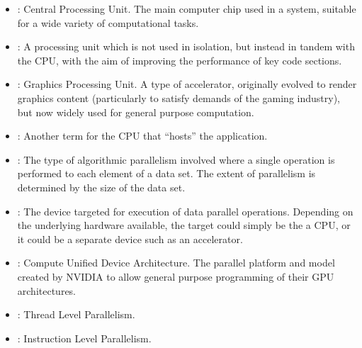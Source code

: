 \begin{itemize}

    \item {}: Central Processing Unit. The main computer chip used in a system, suitable for a wide variety of computational tasks.
    \item {}: A processing unit which is not used in isolation, but instead in tandem with the CPU, with the aim of improving the performance of key code sections. 
    \item {}: Graphics Processing Unit. A type of accelerator, originally evolved to render graphics content (particularly to satisfy demands of the gaming industry), but now widely used for general purpose computation.
    \item {}: Another term for the CPU that ``hosts'' the application.
    \item {}: The type of algorithmic parallelism involved where a single operation is performed to each element of a data set. The extent of parallelism is determined by the size of the data set.
    \item {}: The device targeted for execution of data parallel operations.  Depending on the underlying hardware available, the target could simply be the a CPU, or it could be a separate device such as an accelerator.
    \item {}: Compute Unified Device Architecture. The parallel platform and model created by NVIDIA to allow general purpose programming of their GPU architectures.
    \item {}: Thread Level Parallelism.
    \item {}: Instruction Level Parallelism.
      
\end{itemize}




